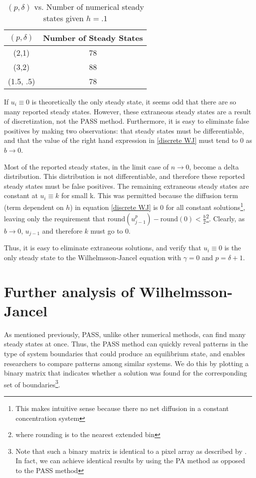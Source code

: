 \documentclass[11pt]{article}
\begin{document}
\begin{table*}
\begin{center}
\label{WJ Statistics}
\begin{tabular}{ | c | c | }
\hline
$(p, \delta)$ & Number of Steady States \\
\hline
(2,1) & 78 \\
\hline
(3,2) & 88 \\ 
\hline
(1.5, .5) & 78 \\
\hline
\end{tabular}
\setcounter{table}{1}
\caption{$(p, \delta)$ vs. Number of numerical steady states given $h = .1$}
\end{center}
\end{table*}

If $u_i \equiv 0$ is theoretically the only steady state, it seems odd that there are so many reported steady states. However, these extraneous steady states are a result of discretization, not the PASS method. Furthermore, it is easy to eliminate false positives by making two observations: that steady states must be differentiable, and that the value of the right hand expression in \cref{discrete WJ} must tend to 0 as $b \rightarrow 0$. 

Most of the reported steady states, in the limit case of $n \rightarrow 0$, become a delta distribution. This distribution is not differentiable, and therefore these reported steady states must be false positives. The remaining extraneous steady states are constant at $u_i \equiv k$ for small k. This was permitted because the diffusion term (term dependent on $h$) in equation \cref{discrete WJ} is 0 for all constant solutions\footnote{This makes intuitive sense because there no net diffusion in a constant concentration system}, leaving only the requirement that $\text{round}(u_{j-1}^p) - \text{round}(0) < \frac{b}{2}$\footnote{where rounding is to the nearest extended bin}. Clearly, as $b \rightarrow 0$, $u_{j-1}$ and therefore $k$ must go to 0.

Thus, it is easy to eliminate extraneous solutions, and verify that $u_i \equiv 0$ is the only steady state to the Wilhelmsson-Jancel equation with $\gamma = 0$ and $p = \delta + 1$.

\section{Further analysis of Wilhelmsson-Jancel}

As mentioned previously, PASS, unlike other numerical methods, can find many steady states at once. Thus, the PASS method can quickly reveal patterns in the type of system boundaries that could produce an equilibrium state, and enables researchers to compare patterns among similar systems. We do this by plotting a binary matrix that indicates whether a solution was found for the corresponding set of boundaries\footnote{Note that such a binary matrix is identical to a pixel array as described by \citep{Introduction_to_PA}. In fact, we can achieve identical results by using the PA method as opposed to the PASS method}.
\end{document}

